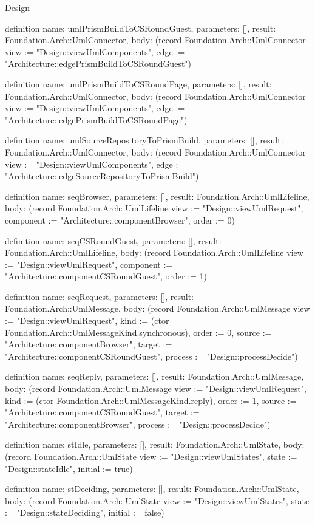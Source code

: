\begin{lexlean}{Design}
\begin{semanticmodule}
definition{
  name: umlPrismBuildToCSRoundGuest,
  parameters: [],
  result: Foundation.Arch::UmlConnector,
  body: (record Foundation.Arch::UmlConnector {view := "Design::viewUmlComponents", edge := "Architecture::edgePrismBuildToCSRoundGuest"})
}

definition{
  name: umlPrismBuildToCSRoundPage,
  parameters: [],
  result: Foundation.Arch::UmlConnector,
  body: (record Foundation.Arch::UmlConnector {view := "Design::viewUmlComponents", edge := "Architecture::edgePrismBuildToCSRoundPage"})
}

definition{
  name: umlSourceRepositoryToPrismBuild,
  parameters: [],
  result: Foundation.Arch::UmlConnector,
  body: (record Foundation.Arch::UmlConnector {view := "Design::viewUmlComponents", edge := "Architecture::edgeSourceRepositoryToPrismBuild"})
}

definition{
  name: seqBrowser,
  parameters: [],
  result: Foundation.Arch::UmlLifeline,
  body: (record Foundation.Arch::UmlLifeline {view := "Design::viewUmlRequest", component := "Architecture::componentBrowser", order := 0})
}

definition{
  name: seqCSRoundGuest,
  parameters: [],
  result: Foundation.Arch::UmlLifeline,
  body: (record Foundation.Arch::UmlLifeline {view := "Design::viewUmlRequest", component := "Architecture::componentCSRoundGuest", order := 1})
}

definition{
  name: seqRequest,
  parameters: [],
  result: Foundation.Arch::UmlMessage,
  body: (record Foundation.Arch::UmlMessage {view := "Design::viewUmlRequest", kind := (ctor Foundation.Arch::UmlMessageKind.synchronous), order := 0, source := "Architecture::componentBrowser", target := "Architecture::componentCSRoundGuest", process := "Design::processDecide"})
}

definition{
  name: seqReply,
  parameters: [],
  result: Foundation.Arch::UmlMessage,
  body: (record Foundation.Arch::UmlMessage {view := "Design::viewUmlRequest", kind := (ctor Foundation.Arch::UmlMessageKind.reply), order := 1, source := "Architecture::componentCSRoundGuest", target := "Architecture::componentBrowser", process := "Design::processDecide"})
}

definition{
  name: stIdle,
  parameters: [],
  result: Foundation.Arch::UmlState,
  body: (record Foundation.Arch::UmlState {view := "Design::viewUmlStates", state := "Design::stateIdle", initial := true})
}

definition{
  name: stDeciding,
  parameters: [],
  result: Foundation.Arch::UmlState,
  body: (record Foundation.Arch::UmlState {view := "Design::viewUmlStates", state := "Design::stateDeciding", initial := false})
}


\end{semanticmodule}
\end{lexlean}
